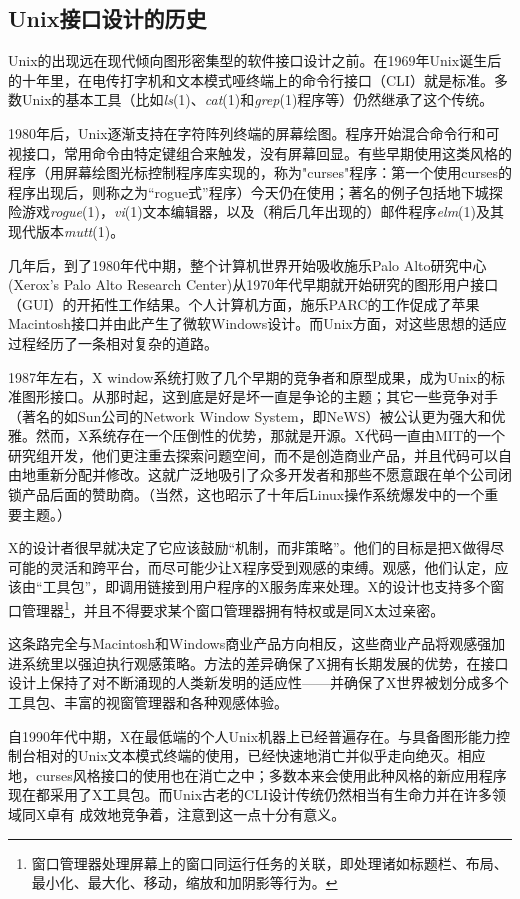 \documentclass[12pt,oneside]{ctexbook}
\begin{document}
\begin{common-format}
\section{Unix接口设计的历史}
Unix的出现远在现代倾向图形密集型的软件接口设计之前。在1969年Unix诞生后的十年里，在电传打字机和文本模式哑终端上的命令行接口（CLI）就是标准。多数Unix的基本工具（比如\textit{ls}(1)、\textit{cat}(1)和\textit{grep}(1)程序等）仍然继承了这个传统。

1980年后，Unix逐渐支持在字符阵列终端的屏幕绘图。程序开始混合命令行和可视接口，常用命令由特定键组合来触发，没有屏幕回显。有些早期使用这类风格的程序（用屏幕绘图光标控制程序库实现的，称为"curses"程序：第一个使用curses的程序出现后，则称之为“rogue式”程序）今天仍在使用；著名的例子包括地下城探险游戏\textit{rogue}(1)，\textit{vi}(1)文本编辑器，以及（稍后几年出现的）邮件程序\textit{elm}(1)及其现代版本\textit{mutt}(1)。

几年后，到了1980年代中期，整个计算机世界开始吸收施乐Palo Alto研究中心(Xerox's Palo Alto Research Center)从1970年代早期就开始研究的图形用户接口（GUI）的开拓性工作结果。个人计算机方面，施乐PARC的工作促成了苹果Macintosh接口并由此产生了微软Windows设计。而Unix方面，对这些思想的适应过程经历了一条相对复杂的道路。

1987年左右，X window系统打败了几个早期的竞争者和原型成果，成为Unix的标准图形接口。从那时起，这到底是好是坏一直是争论的主题；其它一些竞争对手（著名的如Sun公司的Network Window System，即NeWS）被公认更为强大和优雅。然而，X系统存在一个压倒性的优势，那就是开源。X代码一直由MIT的一个研究组开发，他们更注重去探索问题空间，而不是创造商业产品，并且代码可以自由地重新分配并修改。这就广泛地吸引了众多开发者和那些不愿意跟在单个公司闭锁产品后面的赞助商。（当然，这也昭示了十年后Linux操作系统爆发中的一个重要主题。）

X的设计者很早就决定了它应该鼓励“机制，而非策略”。他们的目标是把X做得尽可能的灵活和跨平台，而尽可能少让X程序受到观感的束缚。观感，他们认定，应该由“工具包”，即调用链接到用户程序的X服务库来处理。X的设计也支持多个窗口管理器\footnote{窗口管理器处理屏幕上的窗口同运行任务的关联，即处理诸如标题栏、布局、最小化、最大化、移动，缩放和加阴影等行为。}，并且不得要求某个窗口管理器拥有特权或是同X太过亲密。

这条路完全与Macintosh和Windows商业产品方向相反，这些商业产品将观感强加进系统里以强迫执行观感策略。方法的差异确保了X拥有长期发展的优势，在接口设计上保持了对不断涌现的人类新发明的适应性——并确保了X世界被划分成多个工具包、丰富的视窗管理器和各种观感体验。

自1990年代中期，X在最低端的个人Unix机器上已经普遍存在。与具备图形能力控制台相对的Unix文本模式终端的使用，已经快速地消亡并似乎走向绝灭。相应地，curses风格接口的使用也在消亡之中；多数本来会使用此种风格的新应用程序现在都采用了X工具包。而Unix古老的CLI设计传统仍然相当有生命力并在许多领域同X卓有
成效地竞争着，注意到这一点十分有意义。


\end{common-format}
\end{document}
